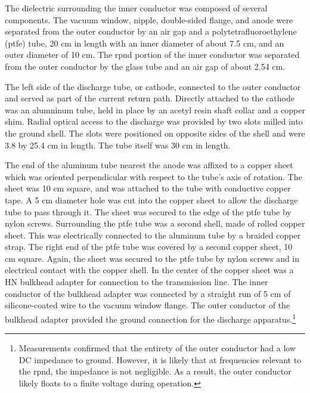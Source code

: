 The dielectric surrounding the inner conductor was composed of several
components. The vacuum window, nipple, double-sided flange, and anode were
separated from the outer conductor by an air gap and a polytetrafluoroethylene
(\acs{ptfe}) tube, 20 cm in length with an inner diameter of about 7.5 cm, and
an outer diameter of 10 cm. The \acs{rpnd} portion of the inner conductor was
separated from the outer conductor by the glass tube and an air gap of about
2.54 cm.

The left side of the discharge tube, or cathode, connected to the outer
conductor and served as part of the current return path. Directly attached to
the cathode was an alumninum tube, held in place by an acetyl resin shaft collar
and a copper shim. Radial optical access to the discharge was provided by two
slots milled into the ground shell. The slots were positioned on opposite sides
of the shell and were 3.8 by 25.4 cm in length. The tube itself was 30 cm in
length.

The end of the aluminum tube nearest the anode was affixed to a copper sheet
which was oriented perpendicular with respect to the tube's axis of rotation.
The sheet was 10 cm square, and was attached to the tube with conductive copper
tape. A 5 cm diameter hole was cut into the copper sheet to allow the discharge
tube to pass through it. The sheet was secured to the edge of the \acs{ptfe}
tube by nylon screws. Surrounding the \acs{ptfe} tube was a second shell, made
of rolled copper sheet. This was electrically connected to the aluminum tube by
a braided copper strap. The right end of the \acs{ptfe} tube was covered by a
second copper sheet, 10 cm square. Again, the sheet was secured to the
\acs{ptfe} tube by nylon screws and in electrical contact with the copper shell.
In the center of the copper sheet was a HN bulkhead adapter for connection to
the transmission line. The inner conductor of the bulkhead adapter was connected
by a straight run of 5 cm of silicone-coated wire to the vacuum window flange.
The outer conductor of the bulkhead adapter provided the ground connection for
the discharge apparatus.\footnote{Measurements confirmed that the entirety of
the outer conductor had a low DC impedance to ground. However, it is likely that
at frequencies relevant to the \acs{rpnd}, the impedance is not negligible. As a
result, the outer conductor likely floats to a finite voltage during operation.}

